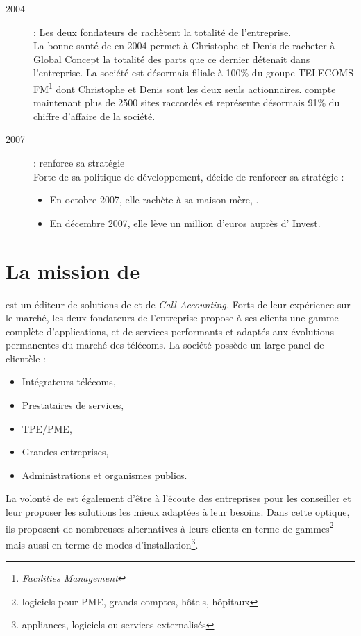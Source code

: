\begin{description}
		\item[2004] : Les deux fondateurs de \memobox{} rachètent la totalité de l'entreprise.\\
			La bonne santé de \memobox{} en 2004 permet à Christophe  et Denis  de racheter à Global Concept la totalité des parts
			que ce dernier détenait dans l'entreprise. La société est désormais filiale à 100\% du groupe TELECOMS FM\footnote{\textit{Facilities Management}} dont Christophe
			 et Denis  sont les deux seuls actionnaires. \adt{} compte maintenant plus de 2500 sites raccordés et représente désormais 91\% du chiffre d'affaire
			de la société.

		\item[2007] : \memobox{} renforce sa stratégie\\
		Forte de sa politique de développement, \memobox{} décide de renforcer sa stratégie :
		\begin{itemize}
			\item En octobre 2007, elle rachète \techno{} à sa maison mère, .
			\item En décembre 2007, elle lève un million d'euros auprès d' Invest.
		\end{itemize}
	\end{description}
	\section{La mission de \mbx{}}
	\mbx{} est un éditeur de solutions de  et de\textit{ Call Accounting.}
	Forts de leur expérience sur le marché, les deux fondateurs de l'entreprise propose à ses clients une gamme complète d’applications, et de services performants et adaptés aux évolutions permanentes du marché des télécoms.
\newpage	
	La société possède un large panel de clientèle : %
	\begin{itemize}
		\item Intégrateurs télécoms,
		\item Prestataires de services,
		\item TPE/PME,
		\item Grandes entreprises,
		\item Administrations et organismes publics.
	\end{itemize}

	La volonté de \mbx{} est également d’être à l’écoute des entreprises pour les conseiller et leur proposer les solutions les mieux adaptées à
	leur besoins. Dans cette optique, ils proposent de nombreuses alternatives à leurs clients en terme de gammes\footnote{logiciels pour PME,
	grands comptes, hôtels, hôpitaux} mais aussi en terme de modes d’installation\footnote{appliances, logiciels ou services externalisés}.

